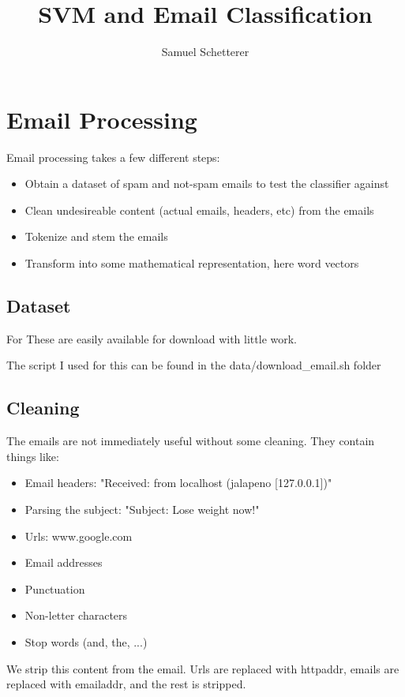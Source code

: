 \documentclass[]{article}
\title{SVM and Email Classification}
\author{Samuel Schetterer}
\begin{document}
\maketitle
\clearpage

\section{Email Processing}
Email processing takes a few different steps:

\begin{itemize}
	\item Obtain a dataset of spam and not-spam emails to test the classifier against
	\item Clean undesireable content (actual emails, headers, etc) from the emails
	\item Tokenize and stem the emails
	\item Transform into some mathematical representation, here word vectors
\end{itemize}

\subsection{Dataset}

For 
These are easily available for download with little work.

The script I used for this can be found in the data/download\_email.sh folder

\subsection{Cleaning}
The emails are not immediately useful without some cleaning. They contain things like:


\begin{itemize}
	\item Email headers: "Received: from localhost (jalapeno [127.0.0.1])"
	\item Parsing the subject: "Subject: Lose weight now!"
	\item Urls: www.google.com
	\item Email addresses
	\item Punctuation
	\item Non-letter characters
	\item Stop words (and, the, ...)
\end{itemize}

We strip this content from the email. Urls are replaced with httpaddr, emails are replaced with emailaddr, and the rest is stripped.
\end{document}
